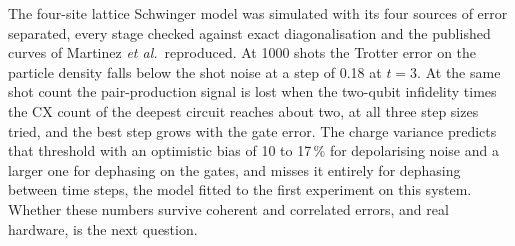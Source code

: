 The four-site lattice Schwinger model was simulated with its four sources of
error separated, every stage checked against exact diagonalisation and the
published curves of Martinez \emph{et al.}\ reproduced. At 1000 shots the Trotter error on the particle density falls
below the shot noise at a step of 0.18 at $t = 3$. At the same shot count the
pair-production signal is lost when the two-qubit infidelity times the CX count
of the deepest circuit reaches about two, at all three step sizes tried, and the
best step grows with the gate error. The charge variance predicts that threshold
with an optimistic bias of 10 to 17\,\% for depolarising noise and a larger one
for dephasing on the gates, and misses it entirely for dephasing between time
steps, the model fitted to the first experiment on this system. Whether these
numbers survive coherent and correlated errors, and real hardware, is the next
question.
